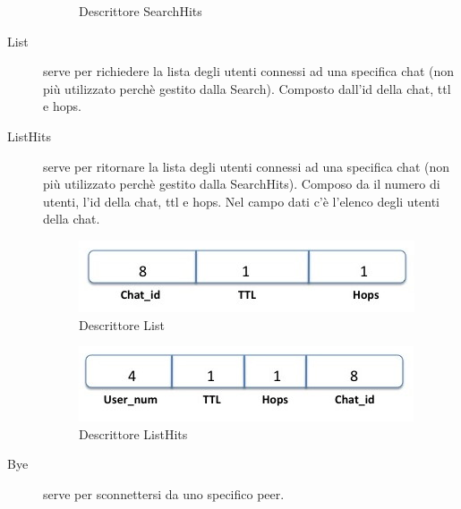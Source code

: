 \begin{description}
\begin{figure}[H]
\begin{center}
\caption{Descrittore SearchHits}
\label{searchhits}
\end{center}
\end{figure}
\item[List] serve per richiedere la lista degli utenti connessi ad una specifica chat (non più utilizzato perchè gestito dalla Search). Composto dall’id della chat, ttl e hops.
\item[ListHits] serve per ritornare la lista degli utenti connessi ad una specifica chat (non più utilizzato perchè gestito dalla SearchHits). Composo da il numero di utenti, l'id della chat, ttl e hops. Nel campo dati c'è l'elenco degli utenti della chat.
\begin{figure}[H]
\begin{center}
\includegraphics[scale=0.7]{etc/list.jpg}
\caption{Descrittore List}
\label{list}
\end{center}
\end{figure}
\begin{figure}[H]
\begin{center}
\includegraphics[scale=0.7]{etc/listhits.jpg}
\caption{Descrittore ListHits}
\label{list}
\end{center}
\end{figure}
\item[Bye] serve per sconnettersi da uno specifico peer.
\end{description}

